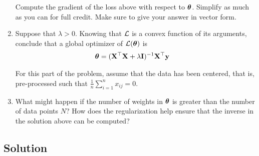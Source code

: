 \documentclass[submit]{harvardml}
\begin{document}
\begin{problem}
\begin{enumerate}
Compute the gradient of the loss above with respect to $\boldsymbol{\theta}$.
Simplify as much as you can for full credit.  Make sure to give your
answer in vector form.

\item Suppose that $\lambda > 0$. Knowing that $\mathcal{L}$ is a convex function
    of its arguments, conclude that a global optimizer of
    $\mathcal{L}(\boldsymbol{\theta})$ is
    \begin{align}
      \boldsymbol{\theta} &= (\mathbf{X}^\top \mathbf{X} + \lambda \mathbf{I})^{-1} \mathbf{X}^\top \mathbf{y}
    \end{align}

For this part of the problem, assume that the data has been centered,
that is, pre-processed such that $\frac{1}{n} \sum_{i=1}^n x_{ij} = 0
$.

\item What might happen if the number of weights in $\boldsymbol{\theta}$ is
  greater than the number of data points $N$?  How does the
  regularization help ensure that the inverse in the solution above
  can be computed?  

\end{enumerate}

\end{problem}

\subsection*{Solution}
\end{document}

